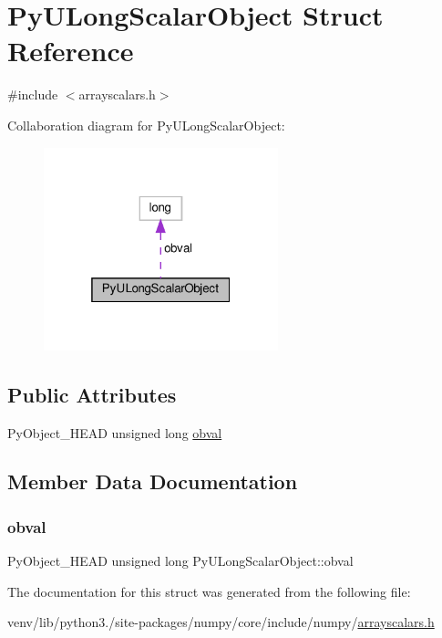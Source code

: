 \hypertarget{structPyULongScalarObject}{}\section{Py\+U\+Long\+Scalar\+Object Struct Reference}
\label{structPyULongScalarObject}


{\ttfamily \#include $<$arrayscalars.\+h$>$}



Collaboration diagram for Py\+U\+Long\+Scalar\+Object\+:
\nopagebreak
\begin{figure}[H]
\begin{center}
\leavevmode
\includegraphics[width=193pt]{structPyULongScalarObject__coll__graph}
\end{center}
\end{figure}
\subsection*{Public Attributes}
\begin{DoxyCompactItemize}
\item 
Py\+Object\+\_\+\+H\+E\+AD unsigned long \hyperlink{structPyULongScalarObject_a65b062c9b4c186a154cde4a4de96d1e5}{obval}
\end{DoxyCompactItemize}


\subsection{Member Data Documentation}
\mbox{\label{structPyULongScalarObject_a65b062c9b4c186a154cde4a4de96d1e5}} 
\subsubsection{\texorpdfstring{obval}{obval}}
{\footnotesize\ttfamily Py\+Object\+\_\+\+H\+E\+AD unsigned long Py\+U\+Long\+Scalar\+Object\+::obval}



The documentation for this struct was generated from the following file\+:\begin{DoxyCompactItemize}
\item 
venv/lib/python3./site-\/packages/numpy/core/include/numpy/\hyperlink{arrayscalars_8h}{arrayscalars.\+h}\end{DoxyCompactItemize}
